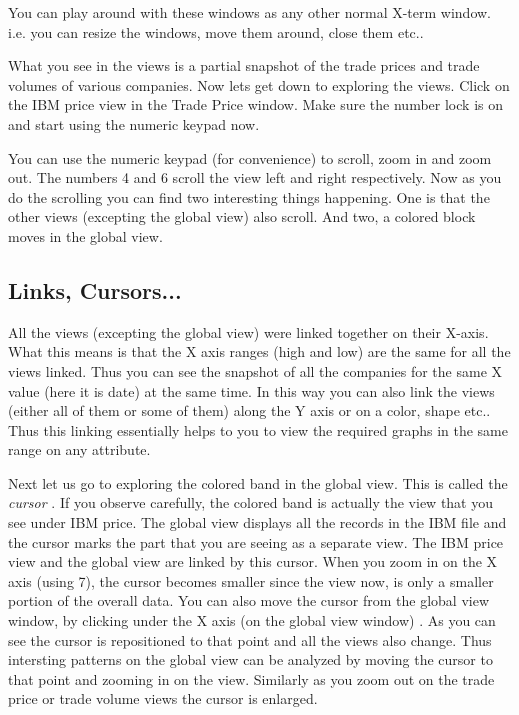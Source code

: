 	You can play around with these windows as any other normal X-term window. i.e. you can resize the windows, move them around, close them etc..


	What you see in the views is a partial snapshot of the trade prices and trade volumes of various companies. Now lets get down to exploring the views. Click on the IBM price view in the Trade Price window. Make sure the number lock is on and start using the numeric keypad now.


	You can use the numeric keypad (for convenience) to scroll, zoom in and zoom out. The numbers 4 and 6 scroll the view left and right respectively. Now as you do the scrolling you can find two interesting things happening. One is that the other views (excepting the global view) also scroll. And two, a colored block moves in the global view.

\subsection{Links, Cursors...}


	All the views (excepting the global view) were linked together on their X-axis. What this means is that the X axis ranges (high and low) are the same for all the views linked. Thus you can see the snapshot of all the companies for the same X value (here it is date) at the same time. In this way you can also link the views (either all of them or some of them) along the Y axis or on a color, shape etc.. Thus this linking essentially helps to you to view the required graphs in the same range on any attribute.

	Next let us go to exploring the colored band in the global view. This is called the {\em cursor }. If you observe carefully, the colored band is actually the view that you see under IBM price. The global view displays all the records in the IBM file and the cursor marks the part that you are seeing as a separate view. The IBM price view and the global view are linked by this cursor. When you zoom in on the X axis (using 7), the cursor becomes smaller since the view now, is only a smaller portion of the overall data. You can also move the cursor from the global view window, by clicking under the X axis (on the global view window) . As you can see the cursor is repositioned to that point and all the views also change. Thus intersting patterns on the global view can be analyzed by moving the cursor to that point and zooming in on the view. Similarly as you zoom out on the trade price or trade volume views the cursor is enlarged.


